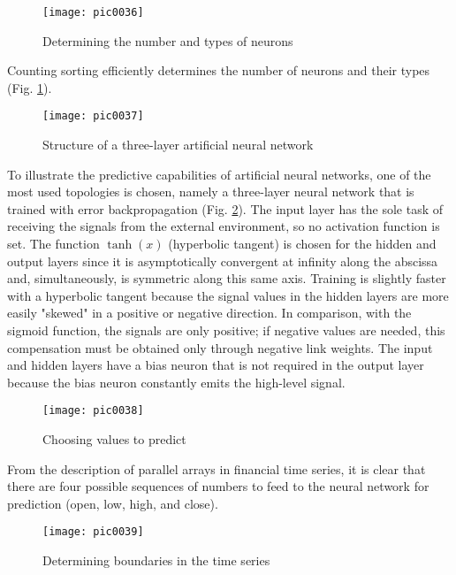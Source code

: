 \begin{figure}[h]
\centering
\texttt{[image: pic0036]}
\caption{Determining the number and types of neurons}
\label{fig:pic0036}
\end{figure}
\FloatBarrier

Counting sorting efficiently determines the number of neurons and their types (Fig. \ref{fig:pic0036}).

\begin{figure}[h]
\centering
\texttt{[image: pic0037]}
\caption{Structure of a three-layer artificial neural network}
\label{fig:pic0037}
\end{figure}
\FloatBarrier

To illustrate the predictive capabilities of artificial neural networks, one of the most used topologies is chosen, namely a three-layer neural network that is trained with error backpropagation (Fig. \ref{fig:pic0037}). The input layer has the sole task of receiving the signals from the external environment, so no activation function is set. The function $\tanh( x )$ (hyperbolic tangent) is chosen for the hidden and output layers since it is asymptotically convergent at infinity along the abscissa and, simultaneously, is symmetric along this same axis. Training is slightly faster with a hyperbolic tangent because the signal values in the hidden layers are more easily "skewed" in a positive or negative direction. In comparison, with the sigmoid function, the signals are only positive; if negative values are needed, this compensation must be obtained only through negative link weights. The input and hidden layers have a bias neuron that is not required in the output layer because the bias neuron constantly emits the high-level signal.

\begin{figure}[h]
\centering
\texttt{[image: pic0038]}
\caption{Choosing values to predict}
\label{fig:pic0038}
\end{figure}
\FloatBarrier

From the description of parallel arrays in financial time series, it is clear that there are four possible sequences of numbers to feed to the neural network for prediction (open, low, high, and close).

\begin{figure}[h]
\centering
\texttt{[image: pic0039]}
\caption{Determining boundaries in the time series}
\label{fig:pic0039}
\end{figure}
\FloatBarrier

